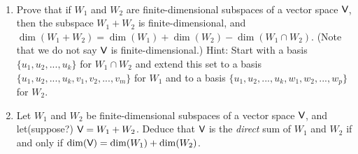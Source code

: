 \begin{exercise} \label{exercise 1.6.29} \ 

\begin{enumerate}
\item Prove that if \(W_1\) and \(W_2\) are finite-dimensional subspaces of a vector space \(\textsf{V}\), then  the subspace \(W_1 + W_2\) is finite-dimensional,  and \(\dim(W_1 + W_2) = \dim(W_1) + \dim(W_2) - \dim(W_1 \cap W_2)\).
(Note that we do not say \(\textsf{V}\) is finite-dimensional.)
Hint: Start with a basis \(\{ u_1, u_2, ..., u_k \}\) for \(W_1 \cap W_2\) and extend this set to a basis \(\{ u_1, u_2, ..., u_k, v_1, v_2, ..., v_m \}\) for \(W_1\) and to a basis \(\{ u_1, u_2, ..., u_k, w_1, w_2, ..., w_p \}\) for \(W_2\).
\item Let \(W_1\) and \(W_2\) be finite-dimensional subspaces of a vector space \(\textsf{V}\), and let(suppose?) \(\textsf{V} = W_1 + W_2\). 
Deduce that \(\textsf{V}\) is the \emph{direct} sum of \(W_1\)
and \(W_2\) if and only if \(\dim(\textsf{V}) = \dim(W_1) + \dim(W_2)\).
\end{enumerate}
\end{exercise}

